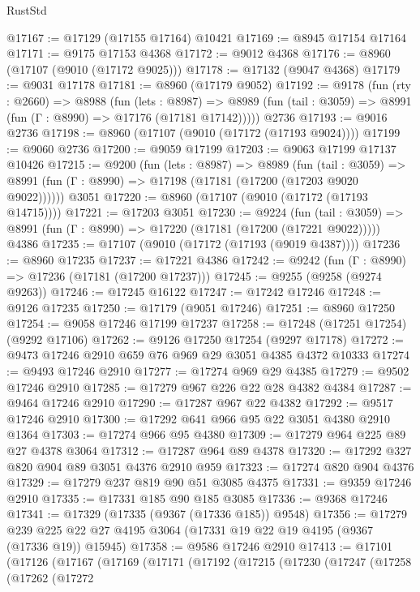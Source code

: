 \begin{lexlean}{RustStd}
\begin{coremodule}
@17167 := @17129 (@17155 @17164) @10421
@17169 := @8945 @17154 @17164
@17171 := @9175 @17153 @4368
@17172 := @9012 @4368
@17176 := @8960 (@17107 (@9010 (@17172 @9025)))
@17178 := @17132 (@9047 @4368)
@17179 := @9031 @17178
@17181 := @8960 (@17179 @9052)
@17192 := @9178
    (fun (rty : @2660) =>
    @8988
      (fun (lets : @8987) =>
      @8989 (fun (tail : @3059) => @8991 (fun (Γ : @8990) => @17176 (@17181 @17142)))))
    @2736
@17193 := @9016 @2736
@17198 := @8960 (@17107 (@9010 (@17172 (@17193 @9024))))
@17199 := @9060 @2736
@17200 := @9059 @17199
@17203 := @9063 @17199 @17137 @10426
@17215 := @9200
    (fun (lets : @8987) =>
    @8989
      (fun (tail : @3059) =>
      @8991 (fun (Γ : @8990) => @17198 (@17181 (@17200 (@17203 @9020 @9022))))))
    @3051
@17220 := @8960 (@17107 (@9010 (@17172 (@17193 @14715))))
@17221 := @17203 @3051
@17230 := @9224
    (fun (tail : @3059) => @8991 (fun (Γ : @8990) => @17220 (@17181 (@17200 (@17221 @9022)))))
    @4386
@17235 := @17107 (@9010 (@17172 (@17193 (@9019 @4387))))
@17236 := @8960 @17235
@17237 := @17221 @4386
@17242 := @9242 (fun (Γ : @8990) => @17236 (@17181 (@17200 @17237)))
@17245 := @9255 (@9258 (@9274 @9263))
@17246 := @17245 @16122
@17247 := @17242 @17246
@17248 := @9126 @17235
@17250 := @17179 (@9051 @17246)
@17251 := @8960 @17250
@17254 := @9058 @17246 @17199 @17237
@17258 := @17248 (@17251 @17254) (@9292 @17106)
@17262 := @9126 @17250 @17254 (@9297 @17178)
@17272 := @9473 @17246 @2910 @659 @76 @969 @29 @3051 @4385 @4372 @10333
@17274 := @9493 @17246 @2910
@17277 := @17274 @969 @29 @4385
@17279 := @9502 @17246 @2910
@17285 := @17279 @967 @226 @22 @28 @4382 @4384
@17287 := @9464 @17246 @2910
@17290 := @17287 @967 @22 @4382
@17292 := @9517 @17246 @2910
@17300 := @17292 @641 @966 @95 @22 @3051 @4380 @2910 @1364
@17303 := @17274 @966 @95 @4380
@17309 := @17279 @964 @225 @89 @27 @4378 @3064
@17312 := @17287 @964 @89 @4378
@17320 := @17292 @327 @820 @904 @89 @3051 @4376 @2910 @959
@17323 := @17274 @820 @904 @4376
@17329 := @17279 @237 @819 @90 @51 @3085 @4375
@17331 := @9359 @17246 @2910
@17335 := @17331 @185 @90 @185 @3085
@17336 := @9368 @17246
@17341 := @17329 (@17335 (@9367 (@17336 @185)) @9548)
@17356 := @17279
    @239
    @225
    @22
    @27
    @4195
    @3064
    (@17331 @19 @22 @19 @4195 (@9367 (@17336 @19)) @15945)
@17358 := @9586 @17246 @2910
@17413 := @17101
    (@17126
      (@17167
        (@17169
          (@17171
            (@17192
              (@17215
                (@17230
                  (@17247
                    (@17258
                      (@17262
                        (@17272

\end{coremodule}
\end{lexlean}
